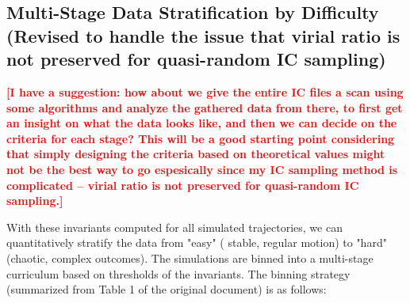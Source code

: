 \documentclass{article}
\newcommand{\authcomment}[1]{\textcolor{Red}{\textbf{[#1]}}}
\begin{document}
\subsection{Multi-Stage Data Stratification by Difficulty (Revised to handle the issue that virial ratio is not preserved for quasi-random IC sampling)}

\authcomment{I have a suggestion: how about we give the entire IC files a scan using some algorithms and analyze the gathered data from there,
to first get an insight on what the data looks like, and then we can
decide on the criteria for each stage? This will be a good starting point considering that simply designing the criteria based on theoretical values
might not be the best way to go espesically since my IC sampling method is complicated – virial ratio is not preserved for quasi-random IC sampling.}

With these invariants computed for all simulated trajectories, we can quantitatively stratify the data from "easy" (
stable, regular motion) to "hard" (chaotic, complex outcomes).  The simulations are binned into a multi-stage curriculum 
based on thresholds of the invariants.  The binning strategy (summarized from Table 1 of the original document) is as follows:
\end{document}
